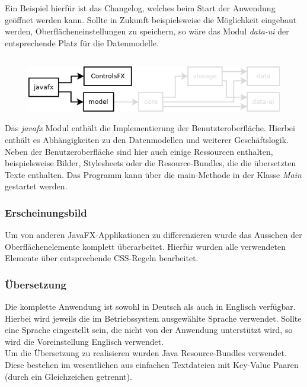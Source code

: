 Ein Beispiel hierfür ist das Changelog, welches beim Start der Anwendung geöffnet werden kann.
Sollte in Zukunft beispielsweise die Möglichkeit eingebaut werden, Oberflächeneinstellungen zu speichern, 
so wäre das Modul \textit{data-ui} der entsprechende Platz für die Datenmodelle.

\subsection{\textModJavaFX}
\label{\textModJavaFX}
\begin{figure}[H]
	\centering
	\includegraphics[width=.8\textwidth]{module_dependencies_javafx.png}
\end{figure}

Das \textit{javafx} Modul enthält die Implementierung der Benutzteroberfläche. Hierbei enthält es Abhängigkeiten
zu den Datenmodellen und weiterer Geschäftslogik. Neben der Benutzeroberfläche sind hier auch einige Ressourcen
enthalten, beispielsweise Bilder, Stylesheets oder die Resource-Bundles, die die übersetzten Texte enthalten.
Das Programm kann über die main-Methode in der Klasse \textit{Main} gestartet werden.

\subsubsection{Erscheinungsbild}
Um \textFlowDesign{} von anderen JavaFX-Applikationen zu differenzieren wurde das Aussehen der Oberflächenelemente
komplett überarbeitet. Hierfür wurden alle verwendeten Elemente über entsprechende CSS-Regeln bearbeitet.

\subsubsection{Übersetzung}
Die komplette Anwendung ist sowohl in Deutsch als auch in Englisch verfügbar. Hierbei wird jeweils die im
Betriebssystem ausgewählte Sprache verwendet. Sollte eine Sprache eingestellt sein, die nicht von der Anwendung
unterstützt wird, so wird die Voreinstellung Englisch verwendet.\\
Um die Übersetzung zu realisieren wurden Java Resource-Bundles verwendet. Diese bestehen im wesentlichen aus
einfachen Textdateien mit Key-Value Paaren (durch ein Gleichzeichen getrennt).

